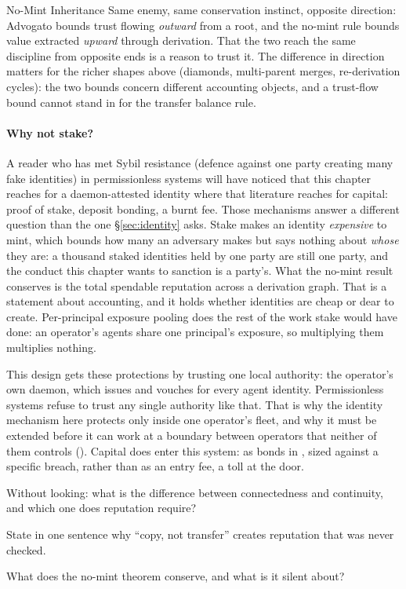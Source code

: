 \documentclass[11pt,a4paper]{article}
\theoremstyle{definition}
\begin{document}
\begin{pdexample}{No-Mint Inheritance}
Same enemy, same
conservation instinct, opposite direction: Advogato bounds trust flowing
\emph{outward} from a root, and the no-mint rule bounds value extracted
\emph{upward} through derivation. That the two reach the same discipline from
opposite ends is a reason to trust it. The difference in direction matters for
the richer shapes above (diamonds, multi-parent merges, re-derivation cycles):
the two bounds concern different accounting objects, and a trust-flow bound
cannot stand in for the transfer balance rule.
\end{pdexample}

\paragraph{Why not stake?} A reader who has met Sybil resistance (defence
against one party creating many fake identities) in permissionless systems will have noticed that this chapter reaches for a
daemon-attested identity where that literature reaches for capital: proof of
stake, deposit bonding, a burnt fee. Those mechanisms answer a different question than the
one \S\ref{sec:identity} asks. Stake makes an identity \emph{expensive} to mint,
which bounds how many an adversary makes but says nothing about \emph{whose}
they are: a thousand staked identities held by one party are still one party,
and the conduct this chapter wants to sanction is a party's. What the
no-mint result conserves is the total spendable reputation across a derivation
graph. That is a statement about accounting, and it holds whether identities
are cheap or dear to create. Per-principal
exposure pooling does the rest of the work stake would have done: an operator's
agents share one principal's exposure, so multiplying them multiplies nothing.

This design gets these protections by trusting one local authority: the
operator's own daemon, which issues and vouches for every agent identity.
Permissionless systems refuse to trust any single authority like that. That is
why the identity mechanism here protects only inside one operator's fleet, and
why it must be extended before it can work at a boundary between operators
that neither of them controls (). Capital
does enter this system: as bonds in ,
sized against a specific breach, rather than as an entry fee, a toll at the
door.
\pdexercisepointerone*{\ref{ex:stp-nomint-sweep}}{\pageref{ex:stp-nomint-sweep}}

\begin{pdrecitation}
\item Without looking: what is the difference between connectedness and
continuity, and which one does reputation require?
\item State in one sentence why ``copy, not transfer'' creates reputation that
was never checked.
\item What does the no-mint theorem conserve, and what is it silent about?
\end{pdrecitation}
\end{document}
